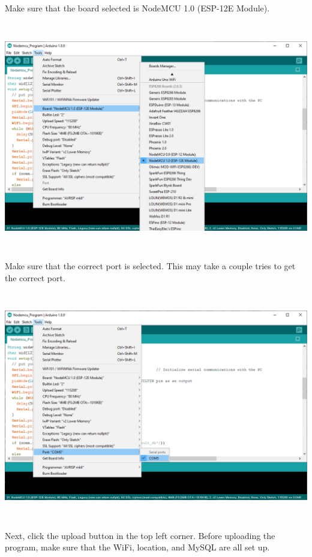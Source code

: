 \documentclass[12pt]{article}
\begin{document}
\begin{spacing}{1.2}
Make sure that the board selected is NodeMCU 1.0 (ESP-12E Module).

\begin{center}
\includegraphics[height=10cm]{Arduino Program 2.PNG}
\end{center}

Make sure that the correct port is selected. This may take a couple tries to get the correct port.

\begin{center}
\includegraphics[height=10cm]{Arduino Program 3.PNG}
\end{center}

Next, click the upload button in the top left corner. Before uploading the program, make sure that the WiFi, location, and MySQL are all set up.


\end{spacing}
\end{document}

